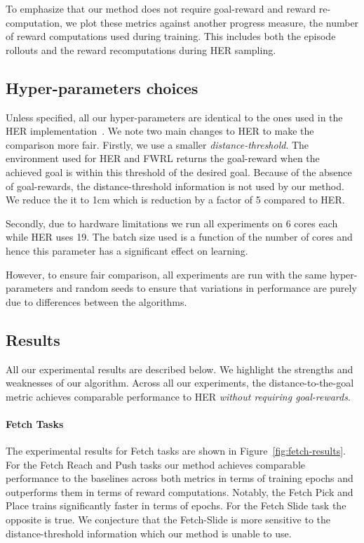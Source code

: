To emphasize that our method does not require goal-reward
and reward re-computation, we plot these metrics against another
progress measure, the number of reward computations used during
training. This includes both the episode rollouts and the reward recomputations
during HER sampling.

%


\subsection{Hyper-parameters choices} \label{sec:hyperparams}
Unless specified, all our hyper-parameters are identical to the ones
used in the HER
implementation~\citep{dhariwal2017baselines}. We note two main changes
to HER to make the comparison more fair. Firstly,
we use a smaller \emph{distance-threshold}.
The environment used for HER and FWRL returns the goal-reward when the
achieved goal is within this threshold of the desired goal. Because of
the absence of goal-rewards, the distance-threshold information is not used by our
method.
We reduce the it to 1cm which is reduction by a factor of 5 compared to
HER.

Secondly, due to hardware limitations we run all experiments on 6
cores each
while HER uses 19. The batch size used is a function of the number of
cores and hence this parameter has a significant effect on learning. 

However, to ensure fair comparison, all experiments are run with the same hyper-parameters and
random seeds to ensure that variations in performance are purely due
to differences between the algorithms.

\subsection{Results}
All our experimental results are described below. We highlight the strengths and
weaknesses of our algorithm. Across all our experiments, the
distance-to-the-goal metric achieves comparable performance to HER
\emph{without requiring goal-rewards}. 

\paragraph{Fetch Tasks}

The experimental results for Fetch tasks are shown in
Figure~\ref{fig:fetch-results}. For the Fetch Reach and Push tasks our
method achieves comparable performance to the baselines 
across both metrics in terms of training epochs and outperforms them in
terms of reward computations. Notably, the Fetch
Pick and Place trains significantly faster in terms of epochs. For the Fetch
Slide task the opposite is true.
We conjecture that the Fetch-Slide is more sensitive to the
distance-threshold information which our method is unable to use.

